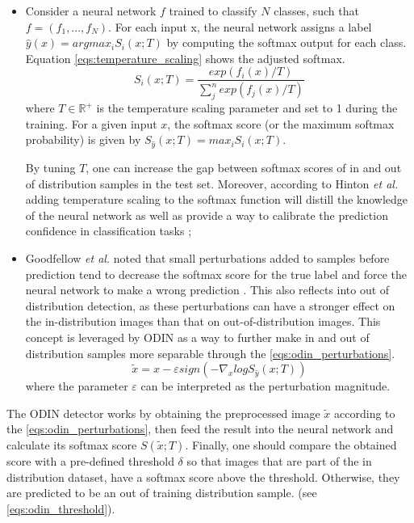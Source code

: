     \begin{itemize}
        \item Consider a neural network $f$ trained to classify $N$ classes, such that $f = (f_1, ..., f_N)$. For each input x, the neural network assigns a label $\hat{y}(x) = argmax_{i} S_{i}(x; T)$ by computing the softmax output for each class. Equation \ref{eqs:temperature_scaling} shows the adjusted softmax.
        \begin{equation}
            S_i(x; T) = \frac{exp(f_i(x)/T)}{\sum_{j}^{n}exp(f_j(x)/T)}
            \label{eqs:temperature_scaling}
        \end{equation}
        where $T \in \mathbb{R}^{+}$ is the temperature scaling parameter and set to 1 during the training. For a given input $x$, the softmax score (or the maximum softmax probability) is given by $S_{\hat{y}}(x; T) = max_i S_i(x; T)$.
        
        By tuning $T$, one can increase the gap between softmax scores of in and out of distribution samples in the test set. Moreover, according to Hinton \textit{et al.} adding temperature scaling to the softmax function will distill the knowledge of the neural network \cite{Hinton2015} as well as provide a way to calibrate the prediction confidence in classification tasks \cite{Guo2017};
        
        \item Goodfellow \textit{et al.} noted that small perturbations added to samples before prediction tend to decrease the softmax score for the true label and force the neural network to make a wrong prediction \cite{Goodfellow2015}. This also reflects into out of distribution detection, as these perturbations can have a stronger effect on the in-distribution images than that on out-of-distribution images. This concept is leveraged by ODIN as a way to further make in and out of distribution samples more separable through the \autoref{eqs:odin_perturbations}.
        \begin{equation}
            \widetilde{x} = x-\varepsilon sign(-\nabla_{x} log S_{\hat{y}}(x;T))
            \label{eqs:odin_perturbations}
        \end{equation}
        where the parameter $\varepsilon$ can be interpreted as the perturbation magnitude.
    \end{itemize}
    The \ac{ODIN} detector works by obtaining the preprocessed image $\widetilde{x}$ according to the \autoref{eqs:odin_perturbations}, then feed the result into the neural network and calculate its softmax score $S(\widetilde{x}; T)$. Finally, one should compare the obtained score with a pre-defined threshold $\delta$ so that images that are part of the in distribution dataset, have a softmax score above the threshold. Otherwise, they are predicted to be an out of training distribution sample. (see \autoref{eqs:odin_threshold}). 
